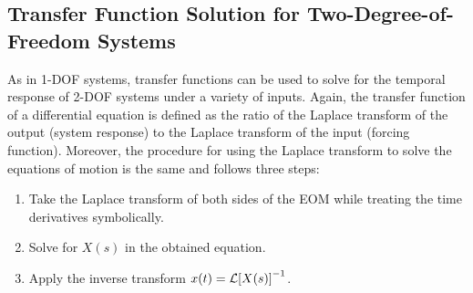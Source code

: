 \documentclass[12pt,letter]{article}
\begin{document}
 
 
 
 
 
 \subsection{Transfer Function Solution for Two-Degree-of-Freedom Systems}
 
 As in 1-DOF systems, transfer functions can be used to solve for the temporal response of 2-DOF systems under a variety of inputs. Again, the transfer function of a differential equation is defined as the ratio of the Laplace transform of the output (system response) to the Laplace transform of the input (forcing function). Moreover, the procedure for using the Laplace transform to solve the equations of motion is the same and follows three steps:
 \begin{enumerate}
  \item Take the Laplace transform of both sides of the EOM while treating the time derivatives symbolically.
  \item Solve for $X(s)$ in the obtained equation.
  \item Apply the inverse transform $x(t) = \mathcal{L}{\left[X(s)\right]}^{-1}$.
 \end{enumerate}
 
\end{document}
